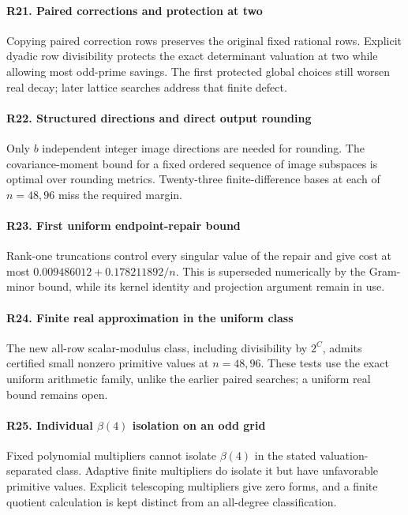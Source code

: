 \paragraph{R21. Paired corrections and protection at two}\label{record-R21}
Copying paired correction rows preserves the original fixed rational rows. Explicit dyadic row divisibility protects the exact determinant valuation at two while allowing most odd-prime savings. The first protected global choices still worsen real decay; later lattice searches address that finite defect.

\paragraph{R22. Structured directions and direct output rounding}\label{record-R22}
Only $b$ independent integer image directions are needed for rounding. The covariance-moment bound for a fixed ordered sequence of image subspaces is optimal over rounding metrics. Twenty-three finite-difference bases at each of $n=48,96$ miss the required margin.

\paragraph{R23. First uniform endpoint-repair bound}\label{record-R23}
Rank-one truncations control every singular value of the repair and give cost at most $0.009486012+0.178211892/n$. This is superseded numerically by the Gram-minor bound, while its kernel identity and projection argument remain in use.

\paragraph{R24. Finite real approximation in the uniform class}\label{record-R24}
The new all-row scalar-modulus class, including divisibility by $2^C$, admits certified small nonzero primitive values at $n=48,96$. These tests use the exact uniform arithmetic family, unlike the earlier paired searches; a uniform real bound remains open.

\paragraph{R25. Individual $\beta(4)$ isolation on an odd grid}\label{record-R25}
Fixed polynomial multipliers cannot isolate $\beta(4)$ in the stated valuation-separated class. Adaptive finite multipliers do isolate it but have unfavorable primitive values. Explicit telescoping multipliers give zero forms, and a finite quotient calculation is kept distinct from an all-degree classification.

